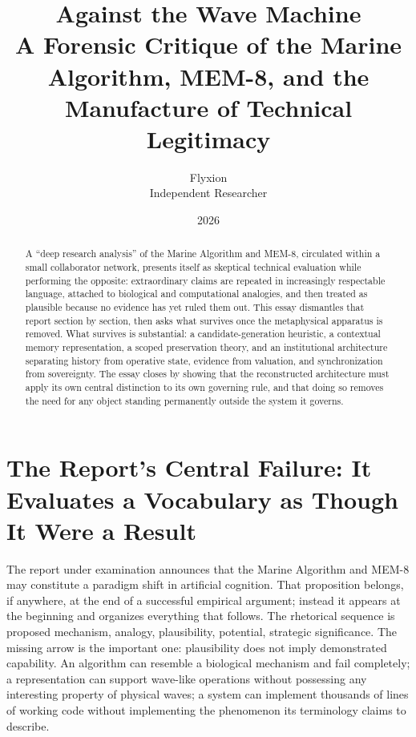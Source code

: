 \documentclass[12pt]{article}
\title{Against the Wave Machine\\
\large A Forensic Critique of the Marine Algorithm, MEM-8, and the Manufacture of Technical Legitimacy}
\author{Flyxion\\ Independent Researcher}
\date{2026}
\begin{document}
\maketitle

\begin{abstract}
A ``deep research analysis'' of the Marine Algorithm and MEM-8, circulated within a small collaborator network, presents itself as skeptical technical evaluation while performing the opposite: extraordinary claims are repeated in increasingly respectable language, attached to biological and computational analogies, and then treated as plausible because no evidence has yet ruled them out. This essay dismantles that report section by section, then asks what survives once the metaphysical apparatus is removed. What survives is substantial: a candidate-generation heuristic, a contextual memory representation, a scoped preservation theory, and an institutional architecture separating history from operative state, evidence from valuation, and synchronization from sovereignty. The essay closes by showing that the reconstructed architecture must apply its own central distinction to its own governing rule, and that doing so removes the need for any object standing permanently outside the system it governs.
\end{abstract}

\section{The Report's Central Failure: It Evaluates a Vocabulary as Though It Were a Result}

The report under examination announces that the Marine Algorithm and MEM-8 may constitute a paradigm shift in artificial cognition. That proposition belongs, if anywhere, at the end of a successful empirical argument; instead it appears at the beginning and organizes everything that follows. The rhetorical sequence is proposed mechanism, analogy, plausibility, potential, strategic significance. The missing arrow is the important one: plausibility does not imply demonstrated capability. An algorithm can resemble a biological mechanism and fail completely; a representation can support wave-like operations without possessing any interesting property of physical waves; a system can implement thousands of lines of working code without implementing the phenomenon its terminology claims to describe.
\end{document}
